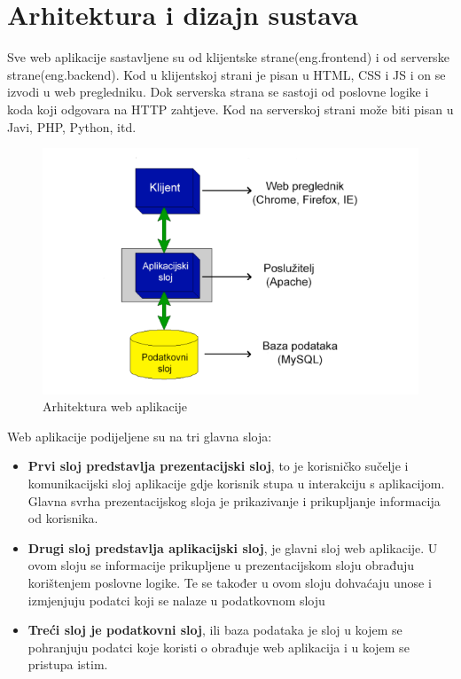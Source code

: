 \chapter{Arhitektura i dizajn sustava}


		Sve web aplikacije sastavljene su od klijentske strane(eng.frontend) i od serverske strane(eng.backend). Kod u klijentskoj strani je pisan u HTML, CSS i JS i on se izvodi u web pregledniku. Dok serverska strana se sastoji od poslovne logike i koda koji odgovara na HTTP zahtjeve. Kod na serverskoj strani može biti pisan u Javi, PHP, Python, itd.
		
		

		\begin{figure}[H]
			
			\includegraphics[width=\textwidth]{slike/webAplikacija.png} %
			\centering
			\caption{Arhitektura web aplikacije}
			\label{fig:arhitekturaWebApp}
		\end{figure}
		Web aplikacije podijeljene su na tri glavna sloja:
		
		\begin{itemize}
			\item \textbf{Prvi sloj predstavlja prezentacijski sloj}, to je korisničko sučelje i komunikacijski sloj aplikacije gdje korisnik stupa u interakciju s aplikacijom. Glavna svrha prezentacijskog sloja je prikazivanje i prikupljanje informacija od korisnika.
			\item\textbf{Drugi sloj predstavlja aplikacijski sloj}, je glavni sloj web aplikacije. U ovom sloju se informacije prikupljene u prezentacijskom sloju obrađuju korištenjem poslovne logike. Te se također u ovom sloju dohvaćaju unose i izmjenjuju podatci koji se nalaze u podatkovnom sloju
			\item\textbf{Treći sloj je podatkovni sloj}, ili baza podataka je sloj u kojem se pohranjuju podatci koje koristi o obrađuje web aplikacija i u kojem se pristupa istim.
		\end{itemize} 
	
